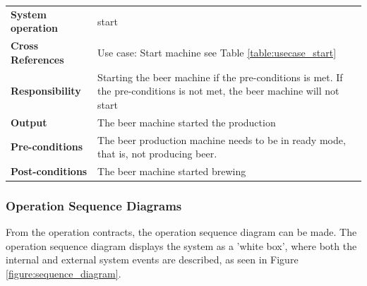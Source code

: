 \begin{table}[H]
    \begin{tabularx}{\textwidth}{|>{\RaggedRight}p{3.7cm}|>{\RaggedRight}X|}
        \hline
        \multicolumn{2}{|c|}{\textbf{start}}\\
        \hline
        \textbf{System operation} & start\\
        \hline
        \textbf{Cross References} & Use case: Start machine see Table \ref{table:usecase_start} \\
        \hline
        \textbf{Responsibility} & Starting the beer machine if the pre-conditions 
        is met.
            If the pre-conditions is not met, the beer machine will not start \\
        \hline
        \textbf{Output} & The beer machine started the production\\
        \hline
        \textbf{Pre-conditions} & 
            The beer production machine needs to be in
            ready mode, that is, not producing beer. \\
        \hline
        \textbf{Post-conditions} & The beer machine started brewing\\
        \hline
    \end{tabularx}
    \label{table:Operation_Contracts_start}
\end{table}

\subsubsection{Operation Sequence Diagrams}
From the operation contracts, the operation sequence diagram can be made. The
operation sequence diagram displays the system as a 'white box', where both the
internal and external system events are described, as seen in Figure
\ref{figure:sequence_diagram}.

